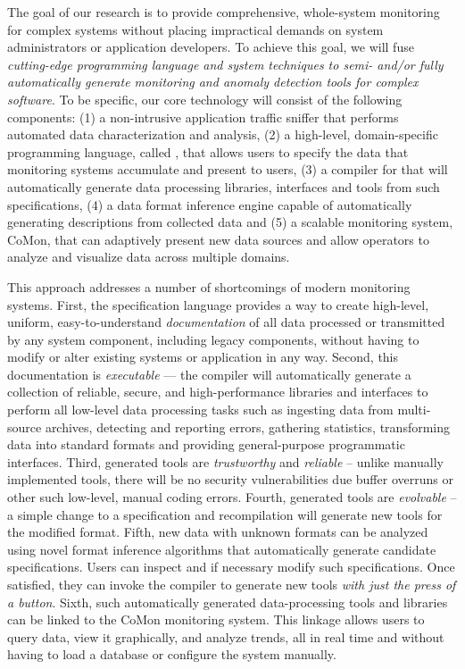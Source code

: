 The goal of our research is to provide comprehensive, whole-system
monitoring for complex systems
without placing impractical demands on system
administrators or application developers.  To achieve this
goal, we will fuse {\em cutting-edge programming language and system
techniques to semi- and/or fully automatically generate monitoring and
anomaly detection tools for complex software}.
To be specific, our core technology will consist of
the following components: (1) a non-intrusive application traffic
sniffer that performs automated data characterization and analysis,
(2) a high-level, domain-specific programming language, called
\pads{}, that allows users to specify the data that monitoring systems
accumulate and present to users, (3) a compiler for \pads{} that will
automatically generate data processing libraries, interfaces and tools
from such specifications, (4) a data format inference engine capable
of automatically generating \pads{} descriptions from
collected data and (5) a scalable monitoring system, CoMon, that can
adaptively present new data sources and allow operators to analyze and
visualize data across multiple domains.

This approach addresses a number of shortcomings of modern monitoring
systems.  First, the \pads{} specification language provides a 
way to create high-level, uniform, easy-to-understand {\em documentation}
of all data processed or transmitted by any system component, 
including legacy components, without having to modify or alter existing
systems or
application in any way.  Second, this documentation is 
{\em executable} --- the
\pads{} compiler will automatically generate a collection of
reliable, secure, and high-performance libraries and interfaces
to perform all low-level data processing tasks such as ingesting
data from multi-source archives, detecting and reporting
errors, gathering statistics, 
transforming data into standard formats and providing
general-purpose programmatic interfaces.  Third, generated
tools are {\em trustworthy} and {\em reliable} -- unlike manually 
implemented tools, there will be no security vulnerabilities due
buffer overruns or other such low-level, manual coding errors.
Fourth, generated tools are {\em evolvable} -- a simple change to
a specification and recompilation will generate new tools for
the modified format.  Fifth, new data with unknown formats can be analyzed
using novel format inference algorithms that automatically generate
candidate specifications.  Users can inspect and if necessary modify
such specifications. Once satisfied, they can invoke the \pads{}
compiler to generate new tools {\em with just the press of a button}.
Sixth, such automatically generated data-processing tools and libraries 
can be linked to the CoMon monitoring
system.  This linkage allows users to query
data, view it graphically, and analyze trends, all in real
time and without having to load a database or configure the system manually.

